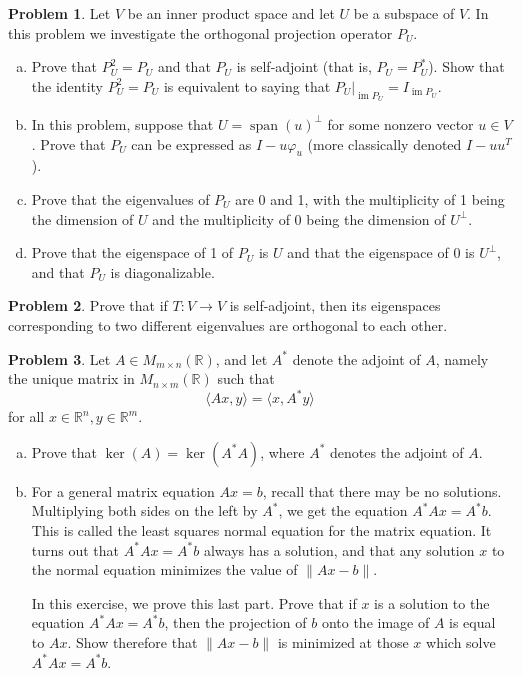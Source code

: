 \documentclass[11pt,oneside]{amsart}
\theoremstyle{definition}
\newtheorem{problem}{Problem}
\newcommand{\bR}{\mathbb{R}}
\DeclareMathOperator{\Span}{span}
\DeclareMathOperator{\im}{im}
\begin{document}
    \begin{problem}
        Let $V$ be an inner product space and let $U$ be a subspace of $V$. In this problem we investigate the orthogonal projection operator $P_U$.
        \begin{enumerate}[(a)]
            \item Prove that $P_U^2=P_U$ and that $P_U$ is self-adjoint (that is, $P_U=P_U^*$). Show that the identity $P_U^2=P_U$ is equivalent to saying that $P_U|_{\im P_U}=I_{\im P_U}$. 
            \item In this problem, suppose that $U=\Span(u)^\perp$ for some nonzero vector $u\in V$. Prove that $P_U$ can be expressed as $I-u\varphi_u$ (more classically denoted $I-uu^T$).
            \item Prove that the eigenvalues of $P_U$ are 0 and 1, with the multiplicity of 1 being the dimension of $U$ and the multiplicity of 0 being the dimension of $U^\perp$.
            \item Prove that the eigenspace of 1 of $P_U$ is $U$ and that the eigenspace of 0 is $U^\perp$, and that $P_U$ is diagonalizable.
        \end{enumerate}
    \end{problem}

    \begin{problem}
        Prove that if $T\colon V\to V$ is self-adjoint, then its eigenspaces corresponding to two different eigenvalues are orthogonal to each other.
    \end{problem}

    \begin{problem}
        Let $A\in M_{m\times n}(\bR)$, and let $A^*$ denote the adjoint of $A$, namely the unique matrix in $M_{n\times m}(\bR)$ such that
        \[\langle Ax,y\rangle=\langle x,A^*y\rangle\]
        for all $x\in \bR^n, y\in\bR^m$.
        \leavevmode\begin{enumerate}[(a)]
            \item Prove that $\ker(A)=\ker(A^*A)$, where $A^*$ denotes the adjoint of $A$.
            \item For a general matrix equation $Ax=b$, recall that there may be no solutions. Multiplying both sides on the left by $A^*$, we get the equation $A^*Ax=A^*b$. This is called the least squares normal equation for the matrix equation. It turns out that $A^*Ax=A^*b$ always has a solution, and that any solution $x$ to the normal equation minimizes the value of $\|Ax-b\|$.
            
            In this exercise, we prove this last part. Prove that if $x$ is a solution to the equation $A^*Ax=A^*b$, then the projection of $b$ onto the image of $A$ is equal to $Ax$. Show therefore that $\|Ax-b\|$ is minimized at those $x$ which solve $A^*Ax=A^*b$.
        \end{enumerate}
    \end{problem}
\end{document}
